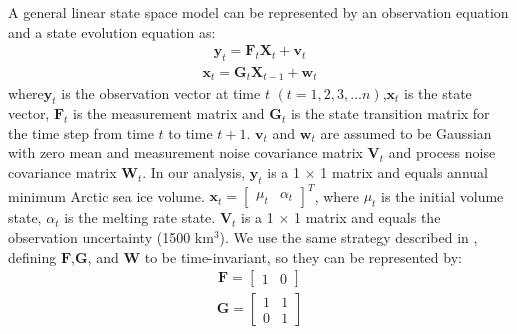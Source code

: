 A general linear state space model can be represented by an observation equation and a state evolution equation as\cite[]{durbin2012time}:
\begin{equation} \label{eq:SI_chpt4_4}
\begin{aligned}
\textbf{y}_{t}=\textbf{F}_{t}\textbf{X}_{t}+\textbf{v}_{t}
\end{aligned}
\end{equation}
\begin{equation} \label{eq:SI_chpt4_5}
\begin{aligned}
\textbf{x}_{t}=\textbf{G}_{t}\textbf{X}_{t-1}+\textbf{w}_{t}
\end{aligned}
\end{equation}
where$\textbf{y}_{t}$ is the observation vector at time $t$ $(t=1,2,3,...n)$,$\textbf{x}_{t}$ is the state vector, $\textbf{F}_{t}$ is the measurement matrix and $\textbf{G}_{t}$ is the state transition matrix for the time step from time $t$ to time $t+1$. $\textbf{v}_{t}$ and $\textbf{w}_{t}$ are assumed to be Gaussian with zero mean and measurement noise covariance matrix $\textbf{V}_{t}$ and process noise covariance matrix $\textbf{W}_{t}$.  In our analysis, $\textbf{y}_{t}$ is a 1 $\times$ 1 matrix and equals annual minimum Arctic sea ice volume. $\textbf{x}_{t}=\begin{bmatrix} \mu_{t} & \alpha_{t} \end{bmatrix}^{T}$, where $\mu_{t}$ is the initial volume state, $\alpha_{t}$ is the melting rate state. $\textbf{V}_{t}$ is a 1 $\times$ 1 matrix and equals the observation uncertainty (1500 km$^{3}$).  We use the same strategy described in \citet{laine2014analysing}, defining $\textbf{F}$,$\textbf{G}$, and $\textbf{W}$ to be time-invariant, so they can be represented by:
\begin{equation} \label{eq:SI_chpt4_6}
\begin{aligned}
\textbf{F}=\begin{bmatrix} 1 & 0 \end{bmatrix}
\end{aligned}
\end{equation}
\begin{equation} \label{eq:SI_chpt4_7}
\begin{aligned}
\textbf{G}=\begin{bmatrix} 1 & 1 \\ 0 & 1\end{bmatrix}
\end{aligned}
\end{equation}
